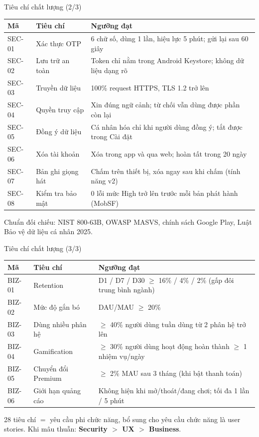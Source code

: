 \documentclass[aspectratio=169]{beamer}
\begin{document}
\begin{frame}{Tiêu chí chất lượng (2/3)}
  \begin{center}\tiny
  \begin{tabular}{@{}p{1.0cm}p{3.1cm}p{7.6cm}@{}}
    \toprule
    \textbf{Mã} & \textbf{Tiêu chí} & \textbf{Ngưỡng đạt} \\
    \midrule
    SEC-01 & Xác thực OTP & 6 chữ số, dùng 1 lần, hiệu lực 5 phút; gửi lại sau 60 giây \\
    SEC-02 & Lưu trữ an toàn & Token chỉ nằm trong Android Keystore; không dữ liệu dạng rõ \\
    SEC-03 & Truyền dữ liệu & 100\% request HTTPS, TLS 1.2 trở lên \\
    SEC-04 & Quyền truy cập & Xin đúng ngữ cảnh; từ chối vẫn dùng được phần còn lại \\
    SEC-05 & Đồng ý dữ liệu & Cá nhân hóa chỉ khi người dùng đồng ý; tắt được trong Cài đặt \\
    SEC-06 & Xóa tài khoản & Xóa trong app và qua web; hoàn tất trong 20 ngày \\
    SEC-07 & Bản ghi giọng hát & Chấm trên thiết bị, xóa ngay sau khi chấm (tính năng v2) \\
    SEC-08 & Kiểm tra bảo mật & 0 lỗi mức High trở lên trước mỗi bản phát hành (MobSF) \\
    \bottomrule
  \end{tabular}
  \end{center}
  \vfill
  {\tiny\color{brandgray} Chuẩn đối chiếu: NIST 800-63B, OWASP MASVS, chính sách Google Play, Luật Bảo vệ dữ liệu cá nhân 2025.}
\end{frame}

\begin{frame}{Tiêu chí chất lượng (3/3)}
  \begin{center}\tiny
  \begin{tabular}{@{}p{1.0cm}p{3.1cm}p{7.6cm}@{}}
    \toprule
    \textbf{Mã} & \textbf{Tiêu chí} & \textbf{Ngưỡng đạt} \\
    \midrule
    BIZ-01 & Retention & D1 / D7 / D30 $\geq$ 16\% / 4\% / 2\% (gấp đôi trung bình ngành) \\
    BIZ-02 & Mức độ gắn bó & DAU/MAU $\geq$ 20\% \\
    BIZ-03 & Dùng nhiều phân hệ & $\geq$ 40\% người dùng tuần dùng từ 2 phân hệ trở lên \\
    BIZ-04 & Gamification & $\geq$ 30\% người dùng hoạt động hoàn thành $\geq$ 1 nhiệm vụ/ngày \\
    BIZ-05 & Chuyển đổi Premium & $\geq$ 2\% MAU sau 3 tháng (khi bật thanh toán) \\
    BIZ-06 & Giới hạn quảng cáo & Không hiện khi mở/thoát/đang chơi; tối đa 1 lần / 5 phút \\
    \bottomrule
  \end{tabular}
  \end{center}
  \vfill
  {\tiny\color{brandgray} 28 tiêu chí $=$ yêu cầu phi chức năng, bổ sung cho yêu cầu chức năng là user stories. Khi mâu thuẫn: \textbf{Security $>$ UX $>$ Business}.}
\end{frame}
\end{document}
